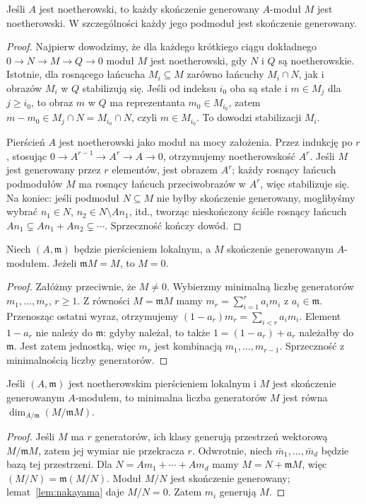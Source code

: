 \begin{twierdzenie}
\label{tw:noeth-mod}
Jeśli $A$ jest noetherowski, to każdy skończenie
generowany $A$-moduł $M$ jest noetherowski.
W szczególności każdy jego podmoduł jest skończenie
generowany.
\end{twierdzenie}
\begin{proof}
Najpierw dowodzimy, że dla każdego krótkiego
ciągu dokładnego $0\to N\to M\to Q\to0$
moduł $M$ jest noetherowski, gdy $N$ i $Q$ są
noetherowskie. Istotnie, dla rosnącego łańcucha
$M_i\subseteq M$ zarówno łańcuchy $M_i\cap N$,
jak i obrazów $M_i$ w $Q$ stabilizują się.
Jeśli od indeksu $i_0$ oba są stałe i $m\in M_j$
dla $j\ge i_0$, to obraz $m$ w $Q$ ma reprezentanta
$m_0\in M_{i_0}$, zatem $m-m_0\in M_j\cap N
=M_{i_0}\cap N$, czyli $m\in M_{i_0}$.
To dowodzi stabilizacji $M_i$.

Pierścień $A$ jest noetherowski jako moduł
na mocy założenia. Przez indukcję po $r$, stosując
$0\to A^{r-1}\to A^r\to A\to0$, otrzymujemy
noetherowskość $A^r$. Jeśli $M$ jest generowany
przez $r$ elementów, jest obrazem $A^r$;
każdy rosnący łańcuch podmodułów $M$ ma rosnący
łańcuch przeciwobrazów w $A^r$, więc stabilizuje się.
Na koniec: jeśli podmoduł $N\subseteq M$ nie byłby
skończenie generowany, moglibyśmy wybrać
$n_1\in N$, $n_2\in N\setminus An_1$, itd.,
tworząc nieskończony ściśle rosnący łańcuch
$An_1\subsetneq An_1+An_2\subsetneq\cdots$.
Sprzeczność kończy dowód.
\end{proof}

\begin{lemat}
\label{lem:nakayama}
Niech $(A,\mathfrak m)$ będzie pierścieniem lokalnym,
a $M$ skończenie generowanym $A$-modułem.
Jeżeli $\mathfrak m M=M$, to $M=0$.
\end{lemat}
\begin{proof}
Załóżmy przeciwnie, że $M\ne0$. Wybierzmy
minimalną liczbę generatorów $m_1,\ldots,m_r$,
$r\ge1$. Z równości $M=\mathfrak m M$ mamy
$m_r=\sum_{i=1}^r a_i m_i$ z $a_i\in\mathfrak m$.
Przenosząc ostatni wyraz, otrzymujemy
$(1-a_r)m_r=\sum_{i<r}a_i m_i$.
Element $1-a_r$ nie należy do $\mathfrak m$:
gdyby należał, to także $1=(1-a_r)+a_r$
należałby do $\mathfrak m$. Jest zatem jednostką,
więc $m_r$ jest kombinacją $m_1,\ldots,m_{r-1}$.
Sprzeczność z minimalnością liczby generatorów.
\end{proof}

\begin{wniosek}
\label{wn:generatory-local}
Jeśli $(A,\mathfrak m)$ jest noetherowskim pierścieniem
lokalnym i $M$ jest skończenie generowanym $A$-modułem,
to minimalna liczba generatorów $M$ jest równa
$\dim_{A/\mathfrak m}(M/\mathfrak mM)$.
\end{wniosek}
\begin{proof}
Jeśli $M$ ma $r$ generatorów, ich klasy generują
przestrzeń wektorową $M/\mathfrak mM$, zatem jej
wymiar nie przekracza $r$. Odwrotnie, niech
$\bar m_1,\ldots,\bar m_d$ będzie bazą tej przestrzeni.
Dla $N=Am_1+\cdots+Am_d$ mamy
$M=N+\mathfrak mM$, więc
$(M/N)=\mathfrak m(M/N)$. Moduł $M/N$ jest
skończenie generowany; lemat~\ref{lem:nakayama}
daje $M/N=0$. Zatem $m_i$ generują $M$.
\end{proof}

